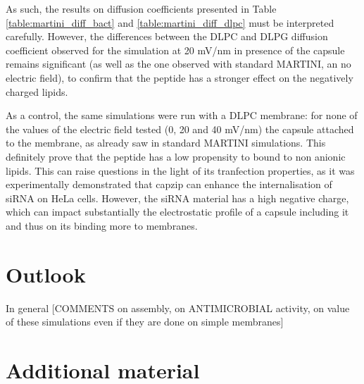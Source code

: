 As such, the results on diffusion coefficients presented in Table \ref{table:martini_diff_bact} and \ref{table:martini_diff_dlpc} must be interpreted carefully. However, the differences between the DLPC and DLPG diffusion coefficient observed for the simulation at 20 mV/nm in presence of the capsule remains significant (as well as the one observed with standard MARTINI, an no electric field), to confirm that the peptide has a stronger effect on the negatively charged lipids.

As a control, the same simulations were run with a DLPC membrane: for none of the values of the electric field tested (0, 20 and 40 mV/nm) the capsule attached to the membrane, as already saw in standard MARTINI simulations.
%
This definitely prove that the peptide has a low propensity to bound to non anionic lipids. This can raise questions in the light of its tranfection properties, as it was experimentally demonstrated that capzip can enhance the internalisation of siRNA on HeLa cells. However, the siRNA material has a high negative charge, which can impact substantially the electrostatic profile of a capsule including it and thus on its binding more to membranes.


\section{Outlook}
In general [COMMENTS on assembly, on ANTIMICROBIAL activity, on value of these simulations even if they are done on simple membranes]

\clearpage
\section{Additional material}




